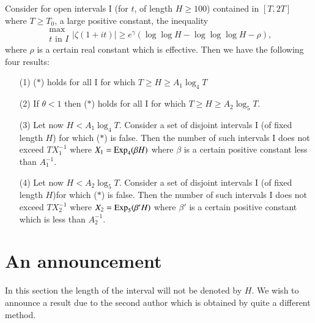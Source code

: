 \begin{theorem}\label{art2-thm6}
Consider for open intervals I (for $t$, of length $H \geqslant 100$) contained in $[T, 2T]$ where $T \geqslant T_0$, a large positive constant, the inequality
\begin{equation*}
\begin{matrix}
\max\\
t \text{ in } I
\end{matrix} |\zeta (1+ it)| \geqslant e^\gamma (\log \log H - \log \log \log H-\rho), 
\tag{$\ast$}
\end{equation*}
where $\rho$ is a certain real constant which is effective. Then we have the following four results:
\begin{itemize}
\item[(1)] ($\ast$) holds for all I for which $T \geqslant H \geqslant A_1 \log_4T$

\item[(2)] If $\theta <1$ then ($\ast$) holds for all I for which $T \geqslant H \geqslant A_2 \log_5 T$. 

\item[(3)] Let now $H < A_1 \log_4 T$. Consider a set of disjoint intervals I (of fixed length $H$) for which ($\ast$) is false. Then the number of such intervals I does not exceed $TX^{-1}_1$ where $X_1 = \operatorname{Exp}_4 (\beta H)$ where $\beta$ is a certain positive constant less than $A^{-1}_1$.

\item[(4)] Let now $H< A_2 \log_5 T$. Consider a set of disjoint intervals I (of fixed length $H$)\pageoriginale for which ($\ast$) is false. Then the number of such intervals I does not exceed $TX^{-1}_2$ where $X_2 = \operatorname{Exp}_5 (\beta' H)$ where $\beta'$ is a certain positive constant which is less than $A^{-1}_2$.
\end{itemize}
\end{theorem}

\section{An announcement}\label{art2-sec5}
In this section the length of the interval will not be denoted by $H$. We wish to announce a result \cite{art2-key16} due to the second author which is obtained by quite a different method. 

